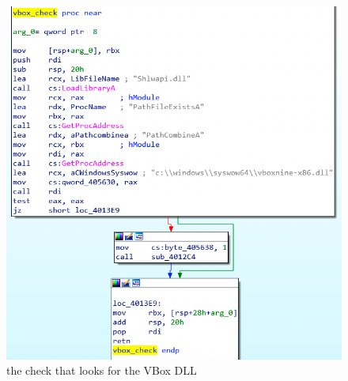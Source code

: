 \begin{figure}[!htbp]
\centering
\includegraphics[width=\linewidth]{media/vbox_check.png}
\caption{the check that looks for the VBox DLL}\label{vbox_check}
\end{figure}
\begin{markdown}

\end{markdown}
